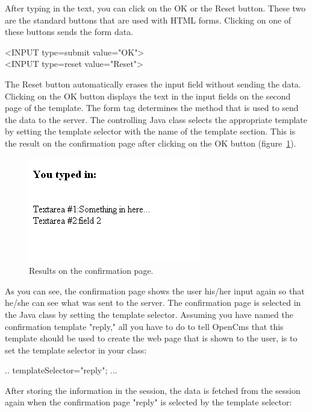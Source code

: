 After typing in the text, you can click on the OK or the Reset button.
These two are the standard buttons that are used with HTML forms.
Clicking on one of these buttons sends the form data.

\begin{java}
<INPUT type=submit value="OK">\\
<INPUT type=reset value="Reset">\\
\end{java}

The Reset button automatically erases the input field without sending
the data. Clicking on the OK button displays the text in the input
fields on the second page of the template. The form tag determines the
method that is used to send the data to the server. The controlling Java
class selects the appropriate template by setting the template selector
with the name of the template section.
This is the result on the confirmation page after clicking on the OK
button (figure~\ref{TypeIn}).

\begin{figure}
\begin{center}
\includegraphics[clip,width=0.5\linewidth]{pics/modules/39}
\end{center}
\caption[Results on the confirmation page]{Results on the confirmation page.}
\label{TypeIn}
\end{figure}

As you can see, the confirmation page shows the user his/her input again
so that he/she can see what was sent to the server. The confirmation
page is selected in the Java class by setting the template selector.
Assuming you have named the confirmation template {\name "reply,"} all you have
to do to tell OpenCms that this template should be used to create the
web page that is shown to the user, is to set the template selector in
your class:

{\code .. templateSelector="reply"; ...}

After storing the information in the session, the data is fetched from
the session again when the confirmation page "reply" is selected by the
template selector:

